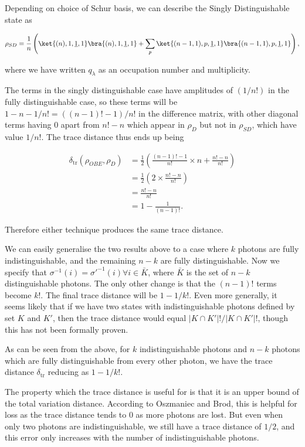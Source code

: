 Depending on choice of Schur basis, we can describe the Singly Distinguishable state as

\begin{equation}
\rho_{SD} = \frac{1}{n}\left(\ket{(n),1,\underline{1},1}\bra{(n),1,\underline{1},1} + \sum_{p}\ket{(n-1,1),p,\underline{1},1}\bra{(n-1,1),p,\underline{1},1}\right),
\end{equation}

\noindent where we have written $q_\lambda$ as an occupation number and multiplicity.

The terms in the singly distinguishable case have amplitudes of $(1/n!)$ in the fully distinguishable case, so these terms will be $1-n - 1/n! = ((n-1)!-1)/n!$ in the difference matrix, with other diagonal terms having $0$ apart from $n!-n$ which appear in $\rho_D$ but not in $\rho_{SD}$, which have value $1/n!$. The trace distance thus ends up being

\begin{align}
\delta_{\mathrm{tr}}(\rho_{OBE},\rho_{D}) &= \frac{1}{2}\left(\frac{(n-1)!-1}{n!}\times n + \frac{n!-n}{n!}\right)\\
&= \frac{1}{2}\left(2\times\frac{n!-n}{n!}\right)\\
&= \frac{n!-n}{n!}\\
&= 1 - \frac{1}{(n-1)!}.
\end{align}

Therefore either technique produces the same trace distance.

We can easily generalise the two results above to a case where $k$ photons are fully indistinguishable, and the remaining $n-k$ are fully distinguishable. Now we specify that $\sigma^{-1}(i)=\sigma'^{-1}(i)\forall i \in \bar{K}$, where $\bar{K}$ is the set of $n-k$ distinguishable photons. The only other change is that the $(n-1)!$ terms become $k!$. The final trace distance will be $1-1/k!$. Even more generally, it seems likely that if we have two states with indistinguishable photons defined by set $K$ and $K'$, then the trace distance would equal $|K\cap K'|!/|K\cap K'|!$, though this has not been formally proven.

As can be seen from the above, for $k$ indistinguishable photons and $n-k$ photons which are fully distinguishable from every other photon, we have the trace distance $\delta_{\mathrm{tr}}$ reducing as $1 - 1/k!$.

The property which the trace distance is useful for is that it is an upper bound of the total variation distance. According to Oszmaniec and Brod, this is helpful for loss as the trace distance tends to $0$ as more photons are lost. But even when only two photons are indistinguishable, we still have a trace distance of $1/2$, and this error only increases with the number of indistinguishable photons.

